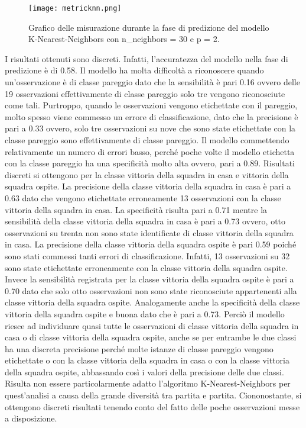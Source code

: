 \begin{figure}[h]
	\begin{center}
		\texttt{[image: metricknn.png]}
		\caption{Grafico delle misurazione durante la fase di predizione del modello K-Nearest-Neighbors con\textsf{ n\_neighbors} = 30 e \textsf{p} = 2.
		} 
		\label{fig:knnmetrics}
	\end{center}
\end{figure}
I risultati ottenuti sono discreti. Infatti, l'accuratezza del modello nella fase di predizione è di 0.58. Il modello ha molta difficoltà a riconoscere quando un’osservazione è di classe pareggio dato che la sensibilità è pari 0.16 ovvero delle 19 osservazioni effettivamente di classe pareggio solo tre vengono riconosciute come tali. Purtroppo, quando le osservazioni vengono etichettate con il pareggio, molto spesso viene commesso un errore di classificazione, dato che la precisione è pari a 0.33 ovvero, solo tre osservazioni su nove che sono state etichettate con la classe pareggio sono effettivamente di classe pareggio. Il modello commettendo relativamente un numero di errori basso, perché poche volte il modello etichetta con la classe pareggio ha una specificità molto alta ovvero, pari a 0.89. Risultati discreti si ottengono per la classe vittoria della squadra in casa e vittoria della squadra ospite. La precisione della classe vittoria della squadra in casa è pari a 0.63 dato che vengono etichettate erroneamente 13 osservazioni con la classe vittoria della squadra in casa. La specificità risulta pari a 0.71 mentre la sensibilità della classe vittoria della squadra in casa è pari a 0.73 ovvero, otto osservazioni su trenta non sono state identificate di classe vittoria della squadra in casa. La precisione della classe vittoria della squadra ospite è pari 0.59 poiché sono stati commessi tanti errori di classificazione. Infatti, 13 osservazioni su 32 sono state etichettate erroneamente con la classe vittoria della squadra ospite. Invece la sensibilità registrata per la classe vittoria della squadra ospite è pari a 0.70 dato che solo otto osservazioni non sono state riconosciute appartenenti alla classe vittoria della squadra ospite. Analogamente anche la specificità della classe vittoria della squadra ospite e buona dato che è pari a 0.73. Perciò il modello riesce ad individuare quasi tutte le osservazioni di classe vittoria della squadra in casa o di classe vittoria della squadra ospite, anche se per entrambe le due classi ha una discreta precisione perché molte istanze di classe pareggio vengono etichettate o con la classe vittoria della squadra in casa o con la classe vittoria della squadra ospite, abbassando così i valori della precisione delle due classi.\\
Risulta non essere particolarmente adatto l'algoritmo K-Nearest-Neighbors per quest'analisi a causa della grande diversità tra partita e partita. Ciononostante, si ottengono discreti risultati tenendo conto del fatto delle poche osservazioni messe a disposizione.
